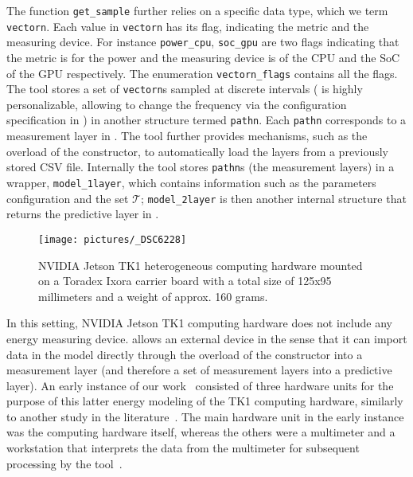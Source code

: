 The function {\small\tt get\_sample} further relies on a specific data type, which we term {\small\tt vectorn}. Each value in {\small\tt vectorn} has its flag, indicating the metric and the measuring device. For instance {\small\tt power\_cpu}, {\small\tt soc\_gpu} are two flags indicating that the metric is for the power and the measuring device is of
the CPU and the SoC of the GPU respectively. The enumeration {\small\tt vectorn\_flags} contains all the flags. The tool stores a set of {\small\tt vectorn}s sampled at discrete intervals (\powprof{} is highly personalizable, allowing to change the frequency via the configuration specification in ) in another structure termed {\small\tt pathn}. Each {\small\tt pathn} corresponds to a measurement layer in . The tool further provides mechanisms, such as the overload of the constructor, to automatically load the layers from a previously stored CSV file. Internally the tool stores {\small\tt pathn}s (the measurement layers) in a wrapper, {\small\tt model\_1layer}, which contains information such as the parameters configuration and the set $\mathcal{T}$; {\small\tt model\_2layer} is then another internal structure that returns the predictive layer in . 
\begin{figure}[h!]
  \centering 
  \texttt{[image: pictures/\_DSC6228]}
  \caption[NVIDIA Jetson TK1 heterogeneous computing hardware]{NVIDIA Jetson TK1 heterogeneous computing hardware mounted on a Toradex Ixora carrier board with a total size of 125x95 millimeters and a weight of approx. 160 grams.} 
  \label{fig:tk1}
\end{figure}
In this setting, NVIDIA Jetson TK1 computing hardware does not include any energy measuring device. \powprof{} allows an external device in the sense that it can import data in the model directly through the overload of the constructor into a measurement layer (and therefore a set of measurement layers into a predictive layer). An early instance of our work~\citep{seewald2019hlpgpu} consisted of three hardware units for the purpose of this latter energy modeling of the TK1 computing hardware, similarly to another study in the literature~\citep{calore2015energy}. The main hardware unit in the early instance was the computing hardware itself, whereas the others were a multimeter and a workstation that interprets the data from the multimeter for subsequent processing by the tool~\citep{seewald2019coarse}.

